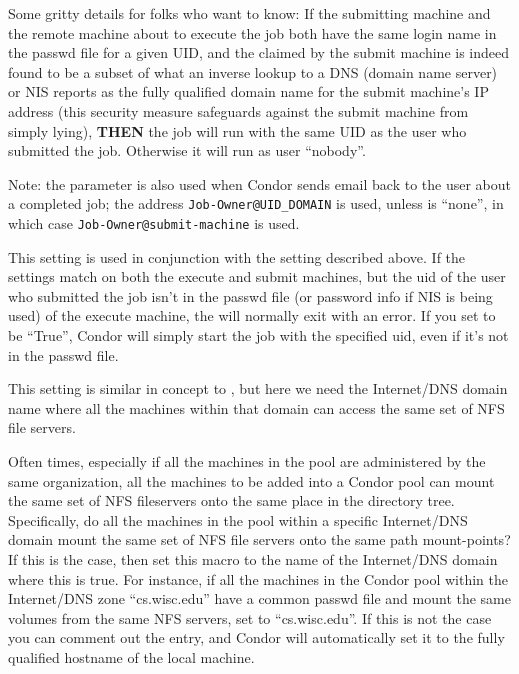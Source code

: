 \begin{description}
  Some gritty details for folks who want to know: If the submitting
  machine and the remote machine about to execute the job both have
  the same login name in the passwd file for a given UID, and the
   claimed by the submit machine is indeed found to
  be a subset of what an inverse lookup to a DNS (domain name server)
  or NIS reports as the fully qualified domain name for the submit
  machine's IP address (this security measure safeguards against the
  submit machine from simply lying), \textbf{THEN} the job will run
  with the same UID as the user who submitted the job.  Otherwise it
  will run as user ``nobody''.
          
  Note: the  parameter is also used when Condor
  sends email back to the user about a completed job; the address
  \texttt{Job-Owner@UID\_DOMAIN} is used, unless 
  is ``none'', in which case \texttt{Job-Owner@submit-machine} is
  used.
  
\item[\Macro{SOFT\_UID\_DOMAIN}] \label{param:SoftUidDomain} This
  setting is used in conjunction with the  setting
  described above.  If the  settings match on both
  the execute and submit machines, but the uid of the user who
  submitted the job isn't in the passwd file (or password info if NIS
  is being used) of the execute machine, the  will
  normally exit with an error.  If you set 
  to be ``True'', Condor will simply start the job with the specified
  uid, even if it's not in the passwd file.

\item[\Macro{FILESYSTEM\_DOMAIN}] \label{param:FilesystemDomain} This
  setting is similar in concept to , but here we
  need the Internet/DNS domain name where all the machines within that
  domain can access the same set of NFS file servers.  
          
  Often times, especially if all the machines in the pool are
  administered by the same organization, all the machines to be added
  into a Condor pool can mount the same set of NFS fileservers onto
  the same place in the directory tree.  Specifically, do all the
  machines in the pool within a specific Internet/DNS domain mount the
  same set of NFS file servers onto the same path mount-points?  If
  this is the case, then set this macro to the name of the
  Internet/DNS domain where this is true.  For instance, if all the
  machines in the Condor pool within the Internet/DNS zone
  ``cs.wisc.edu'' have a common passwd file and mount the same volumes
  from the same NFS servers, set  to
  ``cs.wisc.edu''.  If this is not the case you can comment out the
  entry, and Condor will automatically set it to the fully qualified
  hostname of the local machine.
  

\end{description}
